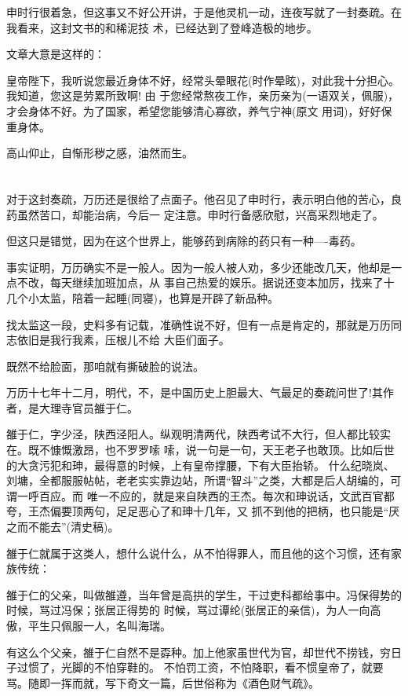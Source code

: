 \documentclass[11pt,a4paper,onecolumn]{article}
\begin{document}
申时行很着急，但这事又不好公开讲，于是他灵机一动，连夜写就了一封奏疏。在我看来，这封文书的和稀泥技
术，已经达到了登峰造极的地步。

文章大意是这样的：

皇帝陛下，我听说您最近身体不好，经常头晕眼花(时作晕眩)，对此我十分担心。我知道，您这是劳累所致啊! 由
于您经常熬夜工作，亲历亲为(一语双关，佩服)，才会身体不好。为了国家，希望您能够清心寡欲，养气宁神(原文
用词)，好好保重身体。

高山仰止，自惭形秽之感，油然而生。

\section[\thesection]{}

对于这封奏疏，万历还是很给了点面子。他召见了申时行，表示明白他的苦心，良药虽然苦口，却能治病，今后一
定注意。申时行备感欣慰，兴高采烈地走了。

但这只是错觉，因为在这个世界上，能够药到病除的药只有一种----毒药。

事实证明，万历确实不是一般人。因为一般人被人劝，多少还能改几天，他却是一点不改，每天继续加班加点，从
事自己热爱的娱乐。据说还变本加厉，找来了十几个小太监，陪着一起睡(同寝)，也算是开辟了新品种。

找太监这一段，史料多有记载，准确性说不好，但有一点是肯定的，那就是万历同志依旧是我行我素，压根儿不给
大臣们面子。

既然不给脸面，那咱就有撕破脸的说法。

万历十七年十二月，明代，不，是中国历史上胆最大、气最足的奏疏问世了!其作者，是大理寺官员雒于仁。

雒于仁，字少泾，陕西泾阳人。纵观明清两代，陕西考试不大行，但人都比较实在。既不慷慨激昂，也不罗罗嗦
嗦，说一句是一句，天王老子也敢顶。比如后世的大贪污犯和珅，最得意的时候，上有皇帝撑腰，下有大臣抬轿。
什么纪晓岚、刘墉，全都服服帖帖，老老实实靠边站，所谓``智斗''之类，大都是后人胡编的，可谓一呼百应。而
唯一不应的，就是来自陕西的王杰。每次和珅说话，文武百官都夸，王杰偏要顶两句，足足恶心了和珅十几年，又
抓不到他的把柄，也只能是``厌之而不能去''(清史稿)。

雒于仁就属于这类人，想什么说什么，从不怕得罪人，而且他的这个习惯，还有家族传统：

雒于仁的父亲，叫做雒遵，当年曾是高拱的学生，干过吏科都给事中。冯保得势的时候，骂过冯保；张居正得势的
时候，骂过谭纶(张居正的亲信)，为人一向高傲，平生只佩服一人，名叫海瑞。

有这么个父亲，雒于仁自然不是孬种。加上他家虽世代为官，却世代不捞钱，穷日子过惯了，光脚的不怕穿鞋的。
不怕罚工资，不怕降职，看不惯皇帝了，就要骂。随即一挥而就，写下奇文一篇，后世俗称为《酒色财气疏》。
\end{document}
